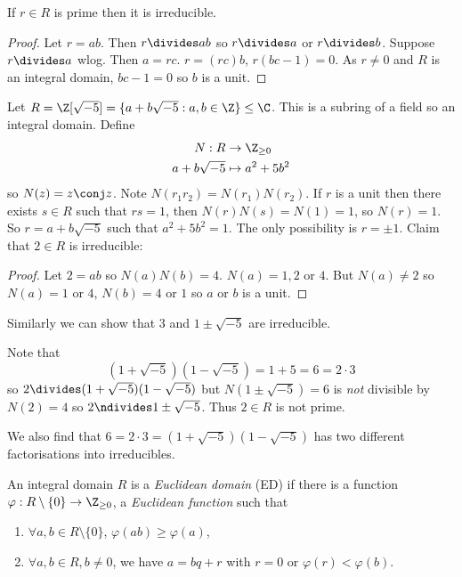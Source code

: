\documentclass[a4paper]{article}
\theoremstyle{definition}
\begin{document}
\begin{lemma}
  If \(r \in R\) is prime then it is irreducible.
\end{lemma}

\begin{proof}
  Let \(r = ab\). Then \(r \divides ab\) so \(r \divides a\) or \(r \divides b\). Suppose \(r \divides a\) wlog. Then \(a = rc\). \(r = (rc)b\), \(r(bc - 1) = 0\). As \(r \neq 0\) and \(R\) is an integral domain, \(bc - 1 = 0\) so \(b\) is a unit.
\end{proof}

\begin{eg}
  Let \(R = \Z[\sqrt{-5}] = \{a + b \sqrt{-5}: a, b \in \Z\} \leq \C\). This is a subring of a field so an integral domain. Define
  \begin{align*}
    N: R &\to \Z_{\geq 0} \\
    a + b\sqrt{-5} &\mapsto a^2 +5b^2
  \end{align*}
  so \(N(z) = z\conj z\). Note \(N(r_1r_2) = N(r_1)N(r_2)\). If \(r\) is a unit then there exists \(s \in R\) such that \(rs = 1\), then \(N(r)N(s) = N(1) = 1\), so \(N(r) = 1\). So \(r = a + b \sqrt{-5}\) such that \(a^2 + 5b^2 = 1\). The only possibility is \(r = \pm 1\). Claim that \(2 \in R\) is irreducible:

  \begin{proof}
    Let \(2 = ab\) so \(N(a)N(b) = 4\). \(N(a) = 1, 2\) or \(4\). But \(N(a) \neq 2\) so \(N(a) = 1\) or \(4\), \(N(b) = 4\) or \(1\) so \(a\) or \(b\) is a unit.
  \end{proof}
  Similarly we can show that \(3\) and \(1 \pm \sqrt{-5}\) are irreducible.

  Note that
  \[
    (1 + \sqrt{-5})(1 - \sqrt{-5}) = 1 + 5 = 6 = 2 \cdot 3
  \]
  so \(2 \divides (1 + \sqrt{-5})(1 - \sqrt{-5})\) but \(N(1 \pm \sqrt{-5}) = 6\) is \emph{not} divisible by \(N(2) = 4\) so \(2 \ndivides 1 \pm \sqrt{-5}\). Thus \(2 \in R\) is not prime.

  We also find that \(6 = 2 \cdot 3 = (1 + \sqrt{-5})(1 - \sqrt{-5})\) has two different factorisations into irreducibles.
\end{eg}

\begin{definition}
  An integral domain \(R\) is a \emph{Euclidean domain} (ED) if there is a function \(\varphi: R \setminus \{0\} \to \Z_{\geq 0}\), a \emph{Euclidean function} such that
  \begin{enumerate}
  \item \(\forall a, b \in R \setminus \{0\}\), \(\varphi(ab) \geq \varphi(a)\),
  \item \(\forall a, b \in R, b \neq 0\), we have \(a = bq + r\) with \(r = 0\) or \(\varphi(r) < \varphi(b)\).
  \end{enumerate}
\end{definition}
\end{document}
